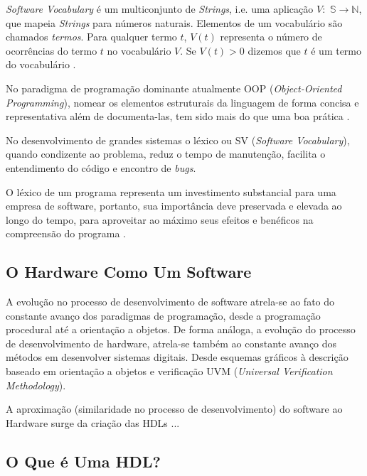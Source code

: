 \documentclass[12pt, twocolumn, a4paper]{article}
\begin{document}
 \textit{Software Vocabulary} é um multiconjunto de \textit{Strings}, i.e. uma aplicação $V:$ $\mathbb{S}\rightarrow\mathbb{N}$, que mapeia \textit{Strings} para números naturais. Elementos de um vocabulário são chamados \textit{termos}. Para qualquer termo $t$, $V(t)$ representa o número de ocorrências do termo $t$ no vocabulário $V$. Se $V(t)>0$ dizemos que $t$ é um termo do vocabulário \cite{Santos2015}.


No paradigma de programação dominante atualmente OOP (\textit{Object-Oriented Programming}), nomear os elementos estruturais da linguagem de forma concisa e representativa além de documenta-las, tem sido mais do que uma boa prática .

 No desenvolvimento de grandes sistemas o léxico ou SV (\textit{Software Vocabulary}), quando condizente ao problema, reduz o tempo de manutenção, facilita o entendimento do código e encontro de \textit{bugs}. 

O léxico de um programa representa um investimento substancial para uma empresa de software, portanto, sua importância deve preservada e elevada ao longo do tempo, para aproveitar ao máximo seus efeitos e benéficos na compreensão do programa \cite{Antoniol2007}.

	\subsection{O Hardware Como Um Software}
\quad A evolução no processo de desenvolvimento de software atrela-se ao fato do constante avanço dos paradigmas de programação, desde a programação procedural até a orientação a objetos. De forma análoga, a evolução do processo de desenvolvimento de hardware, atrela-se também ao constante avanço dos métodos em desenvolver sistemas digitais. Desde esquemas gráficos à descrição baseado em orientação a objetos e verificação UVM (\textit{Universal Verification Methodology}).

A aproximação (similaridade no processo de desenvolvimento) do software ao Hardware surge da criação das HDLs ...

	\subsection{O Que é Uma HDL?}
\end{document}

